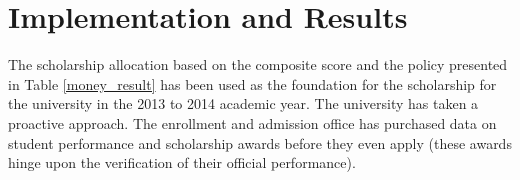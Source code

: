 \documentclass[12pt,english]{report}
\begin{document}

\newpage
\section{Implementation and Results}
The scholarship allocation based on the composite score and the policy presented in Table \ref{money_result} has been used as the foundation for the scholarship for the university in the 2013 to 2014 academic year.  The university has taken a proactive approach. The enrollment and admission office has purchased data on student performance and scholarship awards before they even apply (these awards hinge upon the verification of their official performance). 
\end{document}
